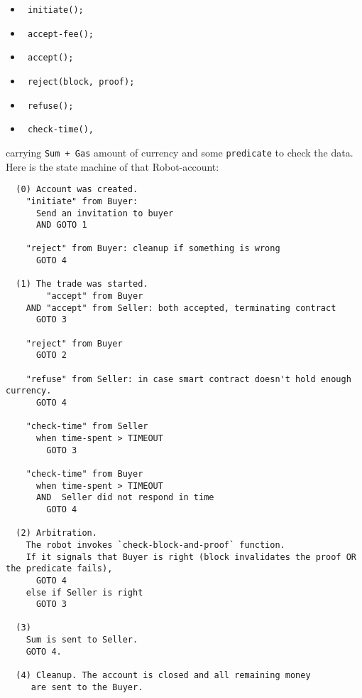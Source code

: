 \documentclass[a4paper]{article}
\begin{document}
\begin{itemize}
  \item \begin{verbatim} initiate(); \end{verbatim}
  \item \begin{verbatim} accept-fee(); \end{verbatim}
  \item \begin{verbatim} accept(); \end{verbatim}
  \item \begin{verbatim} reject(block, proof); \end{verbatim}
  \item \begin{verbatim} refuse(); \end{verbatim}
  \item \begin{verbatim} check-time(), \end{verbatim}
\end{itemize}
carrying \verb|Sum + Gas| amount of currency and some \verb|predicate| to check the data.
\newline
\newline
Here is the state machine of that Robot-account:

\begin{verbatim}
  (0) Account was created.
    "initiate" from Buyer:
      Send an invitation to buyer
      AND GOTO 1

    "reject" from Buyer: cleanup if something is wrong
      GOTO 4

  (1) The trade was started.
        "accept" from Buyer
    AND "accept" from Seller: both accepted, terminating contract
      GOTO 3

    "reject" from Buyer
      GOTO 2

    "refuse" from Seller: in case smart contract doesn't hold enough currency.
      GOTO 4

    "check-time" from Seller
      when time-spent > TIMEOUT
        GOTO 3

    "check-time" from Buyer
      when time-spent > TIMEOUT
      AND  Seller did not respond in time
        GOTO 4

  (2) Arbitration.
    The robot invokes `check-block-and-proof` function.
    If it signals that Buyer is right (block invalidates the proof OR the predicate fails),
      GOTO 4
    else if Seller is right
      GOTO 3

  (3)
    Sum is sent to Seller.
    GOTO 4.

  (4) Cleanup. The account is closed and all remaining money
     are sent to the Buyer.

\end{verbatim}
\end{document}
